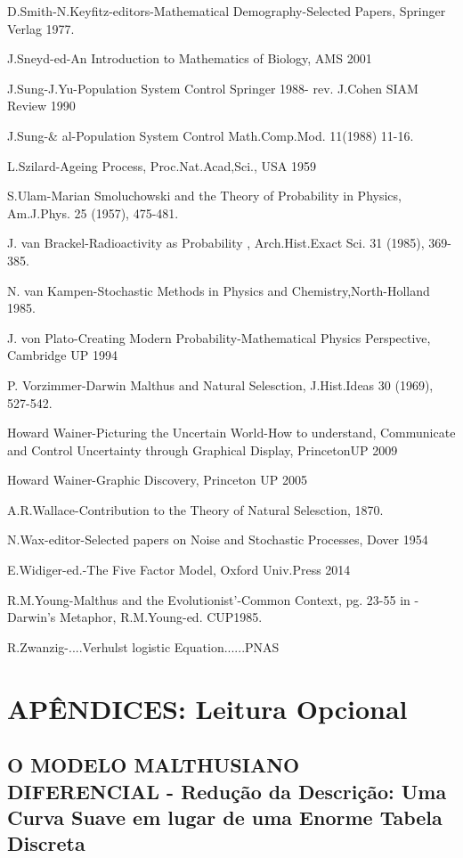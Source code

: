 D.Smith-N.Keyfitz-editors-Mathematical Demography-Selected Papers, Springer Verlag 1977.

J.Sneyd-ed-An Introduction to Mathematics of Biology, AMS 2001

J.Sung-J.Yu-Population System Control Springer 1988- rev. J.Cohen SIAM Review 1990

J.Sung-\& al-Population System Control Math.Comp.Mod. 11(1988) 11-16.

L.Szilard-Ageing Process, Proc.Nat.Acad,Sci., USA 1959

S.Ulam-Marian Smoluchowski and the Theory of Probability in Physics, Am.J.Phys. 25 (1957), 475-481.

J. van Brackel-Radioactivity as Probability , Arch.Hist.Exact Sci. 31 (1985), 369-385.

N. van Kampen-Stochastic Methods in Physics and Chemistry,North-Holland 1985.

J. von Plato-Creating Modern Probability-Mathematical Physics Perspective, Cambridge UP 1994

P. Vorzimmer-Darwin Malthus and Natural Selesction, J.Hist.Ideas 30 (1969), 527-542.

Howard Wainer-Picturing the Uncertain World-How to understand, Communicate and Control Uncertainty through Graphical Display, PrincetonUP 2009

Howard Wainer-Graphic Discovery, Princeton UP 2005

A.R.Wallace-Contribution to the Theory of Natural Selesction, 1870.

N.Wax-editor-Selected papers on Noise and Stochastic Processes, Dover 1954

E.Widiger-ed.-The Five Factor Model, Oxford Univ.Press 2014

R.M.Young-Malthus and the Evolutionist’-Common Context, pg. 23-55 in -Darwin’s Metaphor, R.M.Young-ed. CUP1985.

R.Zwanzig-....Verhulst logistic Equation......PNAS



\chapter{APÊNDICES: Leitura Opcional}
\addt

\section{O MODELO MALTHUSIANO DIFERENCIAL - Redução da Descrição: Uma Curva Suave em lugar de uma Enorme Tabela Discreta}

